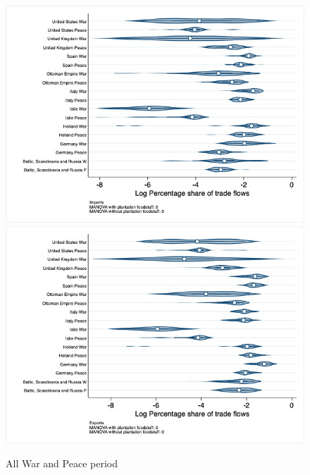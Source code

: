 \documentclass[12pt,a4paper,notitlepage,english]{article}
\begin{document}
\begin{figure}
\caption{All War and Peace period}
\label{peace_war_nat_distr_pays7}
\includegraphics[scale=.4]{peace_war_nat_distr_Ipays7}
\includegraphics[scale=.4]{peace_war_nat_distr_Xpays7}
\end{figure}
\end{document}
